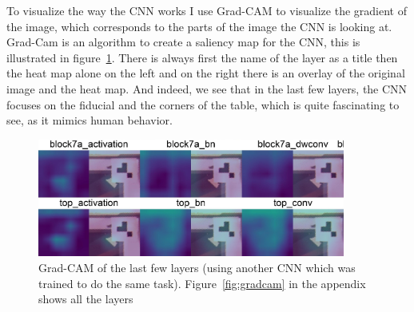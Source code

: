 To visualize the way the CNN works I use Grad-CAM\autocite{Selvaraju_2019} to visualize the gradient of the image, which corresponds to the parts of the image the CNN is looking at.
Grad-Cam is an algorithm to create a saliency map for the CNN, this is illustrated in figure~\ref{fig:gradcam_combined_image}.
There is always first the name of the layer as a title then the heat map alone on the left and on the right there is an overlay of the original image and the heat map.
And indeed, we see that in the last few layers, the CNN focuses on the fiducial and the corners of the table, which is quite fascinating to see, as it mimics human behavior.
\begin{figure}[H]
    \centering
    \includegraphics[width=0.9\textwidth]{../photos/gradcam_combined_image_cropped}
    \caption[cnn-gradcam]{Grad-CAM of the last few layers (using another CNN which was trained to do the same task). Figure~\ref{fig:gradcam} in the appendix shows all the layers}
    \label{fig:gradcam_combined_image}
\end{figure}\\



